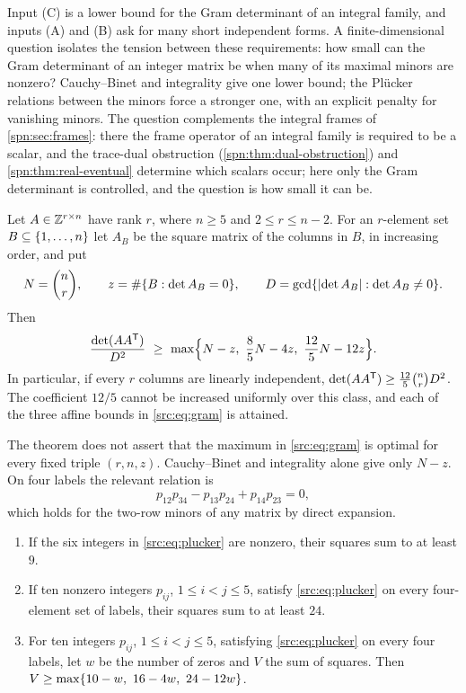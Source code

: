 Input (C) is a lower bound for the Gram determinant of an integral family, and inputs (A) and
(B) ask for many short independent forms. A finite-dimensional question isolates the tension
between these requirements: how small can the Gram determinant of an integer matrix be when
many of its maximal minors are nonzero? Cauchy--Binet and integrality give one lower bound; the
Pl\"ucker relations between the minors force a stronger one, with an explicit penalty for
vanishing minors. The question complements the integral frames of \cref{spn:sec:frames}: there
the frame operator of an integral family is required to be a scalar, and the trace-dual
obstruction (\cref{spn:thm:dual-obstruction}) and \cref{spn:thm:real-eventual} determine which
scalars occur; here only the Gram determinant is controlled, and the question is how small it
can be.

\begin{theorem}\label{src:thm:gram}
Let $A\in\mathbb{Z}^{r\times n}$ have rank $r$, where $n\ge5$ and $2\le r\le n-2$. For an $r$-element
set $B\subseteq\{1,\dots,n\}$ let $A_B$ be the square matrix of the columns in $B$, in
increasing order, and put
\[
 N=\binom nr,\qquad z=\#\{B:\det A_B=0\},\qquad
 D=\gcd\{\lvert\det A_B\rvert:\det A_B\ne0\}.
\]
Then
\begin{equation}\label{src:eq:gram}
 \frac{\det(AA^{\srctr})}{D^2}\ \ge\ \max\Bigl\{N-z,\ \frac85N-4z,\ \frac{12}5N-12z\Bigr\}.
\end{equation}
In particular, if every $r$ columns are linearly independent,
$\det(AA^{\mathsf{T}})\ge\tfrac{12}5\binom nrD^2$. The coefficient $12/5$ cannot be increased
uniformly over this class, and each of the three affine bounds in \eqref{src:eq:gram} is
attained.
\end{theorem}

The theorem does not assert that the maximum in \eqref{src:eq:gram} is optimal for every fixed
triple $(r,n,z)$. Cauchy--Binet and integrality alone give only $N-z$. On four labels the
relevant relation is
\begin{equation}\label{src:eq:plucker}
 p_{12}p_{34}-p_{13}p_{24}+p_{14}p_{23}=0,
\end{equation}
which holds for the two-row minors of any matrix by direct expansion.

\begin{lemma}\label{src:lem:plucker}
\begin{enumerate}[label=\textup{(\roman*)}]
\item If the six integers in \eqref{src:eq:plucker} are nonzero, their squares sum to at least
$9$.
\item If ten nonzero integers $p_{ij}$, $1\le i<j\le5$, satisfy \eqref{src:eq:plucker} on every
four-element set of labels, their squares sum to at least $24$.
\item For ten integers $p_{ij}$, $1\le i<j\le5$, satisfying \eqref{src:eq:plucker} on every
four labels, let $w$ be the number of zeros and $V$ the sum of squares. Then
$V\ge\max\set{10-w,\ 16-4w,\ 24-12w}$.
\end{enumerate}
\end{lemma}

